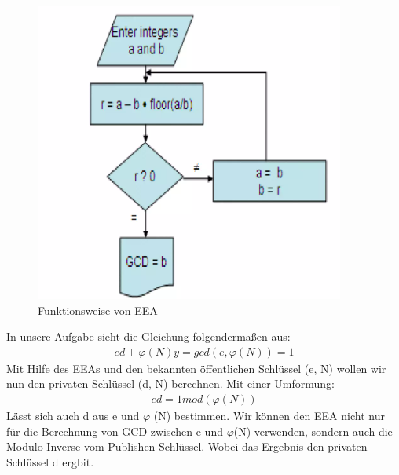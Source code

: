 \documentclass[course=asp]{aspdoc}
\begin{document}
\begin{figure}[h]
\centering
\includegraphics[scale = 0.8]{eea.png}
\caption{Funktionsweise von EEA}
\end{figure}
\newpage
 
In unsere Aufgabe sieht die Gleichung folgendermaßen aus:
\begin{align}
	ed + \varphi (N)y = gcd(e, \varphi(N)) = 1
\end{align}
Mit Hilfe des EEAs und den bekannten öffentlichen Schlüssel (e, N) wollen wir nun den privaten Schlüssel (d, N) berechnen. Mit einer Umformung: 
\begin{align}	
	ed = 1 mod (\varphi(N))
\end{align}
Lässt sich auch d aus e und $\varphi $ (N) bestimmen. Wir können den EEA nicht nur für die Berechnung von GCD zwischen e und $\varphi $(N) verwenden, sondern auch die Modulo Inverse vom Publishen Schlüssel. Wobei das Ergebnis den privaten Schlüssel d ergbit.
\end{document}
